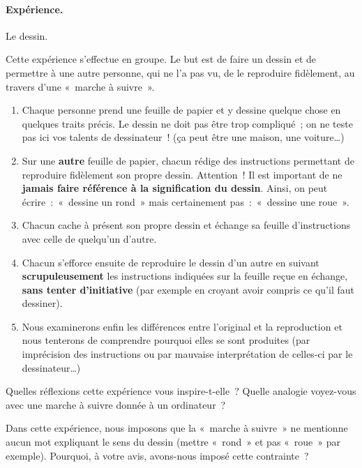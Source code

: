 			\begin{Emphase}
				\paragraph{Expérience.} Le dessin.
				
				Cette expérience s’effectue en groupe.
				Le but est de faire un dessin 
				et de permettre à une autre personne, 
				qui ne l’a pas vu, 
				de le reproduire fidèlement, 
				au travers d’une «~marche à suivre~».
	
				\begin{enumerate}
				\item
					Chaque personne prend une feuille de papier et 
					y dessine quelque chose en quelques traits précis. 
					Le dessin ne doit pas être trop compliqué~; 
					on ne teste pas ici vos talents de dessinateur~! 
					(ça peut être une maison, une voiture\dots)
				\item
					Sur une \textbf{autre} feuille de papier, 
					chacun rédige des instructions permettant de 
					reproduire fidèlement son propre dessin. 
					Attention~! Il est important de ne
					\textbf{jamais faire référence à la signification du dessin}. 
					Ainsi, on peut écrire~:~«~dessine un rond~» 
					mais certainement pas~:~«~dessine une roue~».
				\item
					Chacun cache à présent son propre dessin et échange 
					sa feuille d’instructions avec celle de quelqu’un d’autre.
				\item
					Chacun s’efforce ensuite 
					de reproduire le dessin d’un autre 
					en suivant \textbf{scrupuleusement} 
					les instructions indiquées sur la feuille reçue en échange, 
					\textbf{sans tenter d’initiative} 
					(par exemple en croyant avoir compris ce
					qu’il faut dessiner).
				\item
					Nous examinerons enfin les différences 
					entre l’original et la reproduction 
					et nous tenterons de comprendre 
					pourquoi elles se sont produites 
					(par imprécision des instructions 
					ou par mauvaise interprétation de celles-ci 
					par le dessinateur\dots)
				\end{enumerate}
			\end{Emphase}
	
			Quelles réflexions cette expérience vous inspire-t-elle~?
			Quelle analogie voyez-vous 
			avec une marche à suivre donnée à un ordinateur~?
	
			Dans cette expérience, 
			nous imposons que la «~marche à suivre~» 
			ne mentionne aucun mot expliquant le sens du dessin 
			(mettre «~rond~» et pas «~roue~» par exemple). 
			Pourquoi, à votre avis, avons-nous imposé cette contrainte~?
	
